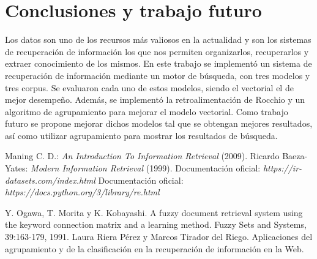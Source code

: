 \documentclass{llncs}
\begin{document}
	\section{Conclusiones y trabajo futuro}
	
	Los datos son uno de los recursos m\'as valiosos en la actualidad y son los sistemas de recuperaci\'on de informaci\'on los que nos permiten organizarlos, recuperarlos y extraer conocimiento de los mismos. En este trabajo se implement\'o un sistema de recuperaci\'on de informaci\'on mediante un motor de b\'usqueda, con tres modelos y tres corpus. Se evaluaron cada uno de estos modelos, siendo el vectorial el de mejor desempe\~no. Adem\'as, se implement\'o la retroalimentaci\'on de Rocchio y un algoritmo de agrupamiento para mejorar el modelo vectorial. Como trabajo futuro se propone mejorar dichos modelos tal que se obtengan mejores resultados, as\'i como utilizar agrupamiento para mostrar los resultados de b\'usqueda. 
	
	
	
	\begin{thebibliography}{20}
		 Maning C. D.: \emph{An Introduction To Information Retrieval} (2009).
		 Ricardo Baeza-Yates: \emph{Modern Information Retrieval} (1999).
		 Documentaci\'on oficial: \emph{https://ir-datasets.com/index.html}
		 Documentaci\'on oficial: \emph{https://docs.python.org/3/library/re.html}
		
		 Y. Ogawa, T. Morita y K. Kobayashi. A fuzzy document retrieval system using the keyword connection matrix and a learning method. Fuzzy Sets and Systems, 39:163-179, 1991.		
		 Laura Riera P\'erez y Marcos Tirador del Riego. Aplicaciones del
		agrupamiento y de la clasificación en la recuperaci\'on	de informaci\'on en la Web.
	\end{thebibliography}
	
\end{document}
